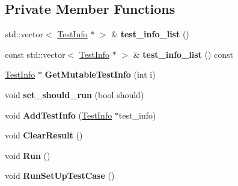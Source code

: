\subsection*{Private Member Functions}
\begin{DoxyCompactItemize}
\item 
\mbox{\label{classtesting_1_1_test_case_adbfcf952eb18dc82d4b20f6bc31aee04}} 
std\+::vector$<$ \mbox{\hyperlink{classtesting_1_1_test_info}{Test\+Info}} $\ast$ $>$ \& {\bfseries test\+\_\+info\+\_\+list} ()
\item 
\mbox{\label{classtesting_1_1_test_case_a7b4460807b77fd63922528a76daf38ba}} 
const std\+::vector$<$ \mbox{\hyperlink{classtesting_1_1_test_info}{Test\+Info}} $\ast$ $>$ \& {\bfseries test\+\_\+info\+\_\+list} () const
\item 
\mbox{\label{classtesting_1_1_test_case_aee03569f8ecb89cfe479e71f11edc3ea}} 
\mbox{\hyperlink{classtesting_1_1_test_info}{Test\+Info}} $\ast$ {\bfseries Get\+Mutable\+Test\+Info} (int i)
\item 
\mbox{\label{classtesting_1_1_test_case_a58ecf00d6682b83caef887682b6012f0}} 
void {\bfseries set\+\_\+should\+\_\+run} (bool should)
\item 
\mbox{\label{classtesting_1_1_test_case_a21ca9697c5f91554c752411f8ea556cf}} 
void {\bfseries Add\+Test\+Info} (\mbox{\hyperlink{classtesting_1_1_test_info}{Test\+Info}} $\ast$test\+\_\+info)
\item 
\mbox{\label{classtesting_1_1_test_case_a4d0498738f8903130a8d0400932e8b54}} 
void {\bfseries Clear\+Result} ()
\item 
\mbox{\label{classtesting_1_1_test_case_a6f5b3724cd5a8e446cd48a6150d08cde}} 
void {\bfseries Run} ()
\item 
\mbox{\label{classtesting_1_1_test_case_a10763d318d617f921803741ec81919c5}} 
void {\bfseries Run\+Set\+Up\+Test\+Case} ()
\item 
\mbox{\label{classtesting_1_1_test_case_a23563c9cbbd004159c6acef2af0e7c39}} 

\end{DoxyCompactItemize}

